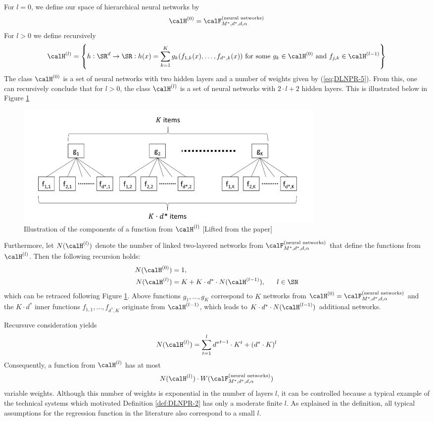 For $l=0$, we define our space of hierarchical neural networks by 
\[\calH^{(0)} = \calF^{\text{(neural networks)}}_{M^*,d^*, d, \alpha} \]
For $l> 0$ we define recursively 
\begin{equation}
	\label{eq:DLNPR-6}
	\calH^{(l)} = \left\{h:\SR^d\rightarrow\SR: h(x) = \sum_{k=1}^K g_k(f_{1,k}(x),\dots, f_{d^*,k}(x))\text{ for some } g_k \in \calH^{(0)}\text{ and }f_{j,k} \in \calH^{(l-1)}\right\}
\end{equation}
The class $\calH^{(0)}$ is a set of neural networks with two hidden layers and a number of weights given by (\ref{eq;DLNPR-5}). From this, one can recursively conclude that for $l>0$, the class $\calH^{(l)}$ is a set of neural networks with $2\cdot l + 2$ hidden layers. This is illustrated below in Figure \ref{fig:DLNPR-Fig2}
\begin{figure}[htbp!]
	\centering
	\includegraphics[width=0.75\textwidth]{Figures/DLNPR-Fig2}
	\caption{Illustration of the components of a function from $\calH^{(l)}$ [Lifted from the paper]}
	\label{fig:DLNPR-Fig2}
\end{figure}
Furthermore, let $N(\calH^{(l)})$ denote the number of linked two-layered networks from $\calF^{\text{(neural networks)}}_{M^*,d^*, d, \alpha}$ that define the functions from $\calH^{(l)}$. Then the following recursion holds: 
\begin{align*}
    N(\calH^{(0)}) &= 1,\\
    N(\calH^{(l)}) &= K + K\cdot d^* \cdot N(\calH^{(l-1)}),\hbox{ }\hbox{ }\hbox{ }\hbox{ }\hbox{ }l\in\SN
\end{align*}
which can be retraced following Figure \ref{fig:DLNPR-Fig2}. Above functions $g_1, \dots, g_K$ correspond to $K$ networks from $\calH^{(0)} =\calF^{\text{(neural networks)}}_{M^*,d^*, d, \alpha} $ and the $K\cdot d^*$ inner functions $f_{1,1},\dots, f_{d^*,K}$ originate from $\calH^{(l-1)}$, which leads to $K\cdot d^* \cdot N(\calH^{(l-1)})$ additional networks. 

Recursuve consideration yields
\begin{equation}
	\label{eq:DLNPR-7}
	N(\calH^{(l)}) = \sum_{t=1}^l {d^*}^{t-1}\cdot K^t + (d^*\cdot K)^l
\end{equation}
Consequently, a function from $\calH^{(l)}$ has at most 
\begin{equation}
	\label{eq:DLNPR-8}
	N(\calH^{(l)})\cdot W(\calF^{\text{(neural networks)}}_{M^*,d^*, d, \alpha})
\end{equation}
variable weights. Although this number of weights is exponential in the number of layers $l$, it can be controlled because a typical example of the technical systems which motivated Definition \ref{def:DLNPR-2} has only a moderate finite $l$. As explained in the definition, all typical assumptions for the regression function in the literature also correspond to a small $l$. 

